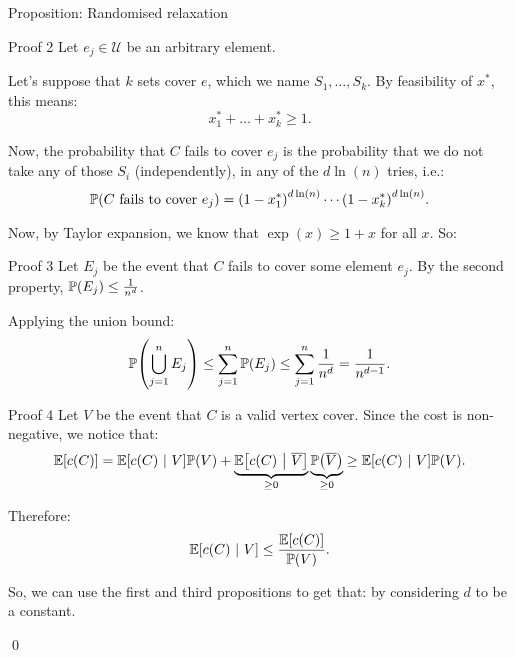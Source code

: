 \documentclass[a4paper]{article}
\begin{document}
\begin{parag}{Proposition: Randomised relaxation}
    \begin{subparag}{Proof 2}
        Let $e_j \in \mathcal{U}$ be an arbitrary element. 

        Let's suppose that $k$ sets cover $e$, which we name $S_1, \ldots, S_k$. By feasibility of $x^*$, this means: 
        \[x_1^* + \ldots + x_k^* \geq 1.\]
        
        Now, the probability that $C$ fails to cover $e_j$ is the probability that we do not take any of those $S_i$ (independently), in any of the $d\ln\left(n\right)$ tries, i.e.: 
        \[\prob\left(\text{$C$ fails to cover $e_j$}\right) = \left(1- x_1^*\right)^{d \ln\left(n\right)} \cdots \left(1 - x_k^*\right)^{d \ln\left(n\right)}.\]

        Now, by Taylor expansion, we know that $\exp\left(x\right) \geq 1 + x$ for all $x$. So:
    \end{subparag}

    \begin{subparag}{Proof 3}
        Let $E_j$ be the event that $C$ fails to cover some element $e_j$. By the second property, $\prob\left(E_j\right) \leq \frac{1}{n^d}$.

        Applying the union bound:
        \[\prob\left(\bigcup_{j=1}^{n} E_j\right) \leq \sum_{j=1}^{n} \prob\left(E_j\right) \leq \sum_{j=1}^{n} \frac{1}{n^d} = \frac{1}{n^{d-1}}.\]
    \end{subparag}

    \begin{subparag}{Proof 4}
        Let $V$ be the event that $C$ is a valid vertex cover. Since the cost is non-negative, we notice that: 
        \[\exval\left[c\left(C\right)\right] = \exval\left[c\left(C\right) \suchthat V\right]\prob\left(V\right) + \underbrace{\exval\left[c\left(C\right) \suchthat \bar{V}\right]}_{\geq 0} \underbrace{\prob\left(\bar{V}\right)}_{\geq 0} \geq \exval\left[c\left(C\right) \suchthat V\right]\prob\left(V\right).\]

        Therefore:
        \[\exval\left[c\left(C\right) \suchthat V\right] \leq \frac{\exval\left[c\left(C\right)\right]}{\prob\left(V\right)}.\]

        So, we can use the first and third propositions to get that: 
        by considering $d$ to be a constant.

        \qed
    \end{subparag}
\end{parag}
\end{document}
